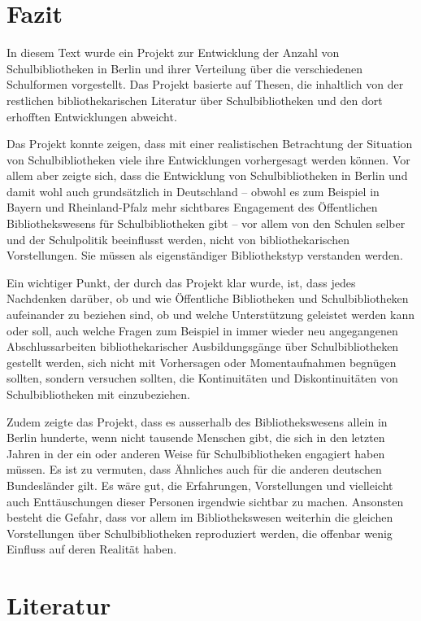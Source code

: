 \documentclass[a4paper,
fontsize=11pt,
oneside,
numbers=noperiodatend,
parskip=half-,
bibliography=totoc,
final
]{scrartcl}
\begin{document}
\section{Fazit}\label{fazit}

In diesem Text wurde ein Projekt zur Entwicklung der Anzahl von
Schulbibliotheken in Berlin und ihrer Verteilung über die verschiedenen
Schulformen vorgestellt. Das Projekt basierte auf Thesen, die inhaltlich
von der restlichen bibliothekarischen Literatur über Schulbibliotheken
und den dort erhofften Entwicklungen abweicht.

Das Projekt konnte zeigen, dass mit einer realistischen Betrachtung der
Situation von Schulbibliotheken viele ihre Entwicklungen vorhergesagt
werden können. Vor allem aber zeigte sich, dass die Entwicklung von
Schulbibliotheken in Berlin und damit wohl auch grundsätzlich in
Deutschland -- obwohl es zum Beispiel in Bayern und Rheinland-Pfalz mehr
sichtbares Engagement des Öffentlichen Bibliothekswesens für
Schulbibliotheken gibt -- vor allem von den Schulen selber und der
Schulpolitik beeinflusst werden, nicht von bibliothekarischen
Vorstellungen. Sie müssen als eigenständiger Bibliothekstyp verstanden
werden.

Ein wichtiger Punkt, der durch das Projekt klar wurde, ist, dass jedes
Nachdenken darüber, ob und wie Öffentliche Bibliotheken und
Schulbibliotheken aufeinander zu beziehen sind, ob und welche
Unterstützung geleistet werden kann oder soll, auch welche Fragen zum
Beispiel in immer wieder neu angegangenen Abschlussarbeiten
bibliothekarischer Ausbildungsgänge über Schulbibliotheken gestellt
werden, sich nicht mit Vorhersagen oder Momentaufnahmen begnügen
sollten, sondern versuchen sollten, die Kontinuitäten und
Diskontinuitäten von Schulbibliotheken mit einzubeziehen.

Zudem zeigte das Projekt, dass es ausserhalb des Bibliothekswesens
allein in Berlin hunderte, wenn nicht tausende Menschen gibt, die sich
in den letzten Jahren in der ein oder anderen Weise für
Schulbibliotheken engagiert haben müssen. Es ist zu vermuten, dass
Ähnliches auch für die anderen deutschen Bundesländer gilt. Es wäre gut,
die Erfahrungen, Vorstellungen und vielleicht auch Enttäuschungen dieser
Personen irgendwie sichtbar zu machen. Ansonsten besteht die Gefahr,
dass vor allem im Bibliothekswesen weiterhin die gleichen Vorstellungen
über Schulbibliotheken reproduziert werden, die offenbar wenig Einfluss
auf deren Realität haben.

\section{Literatur}\label{literatur}
\end{document}
